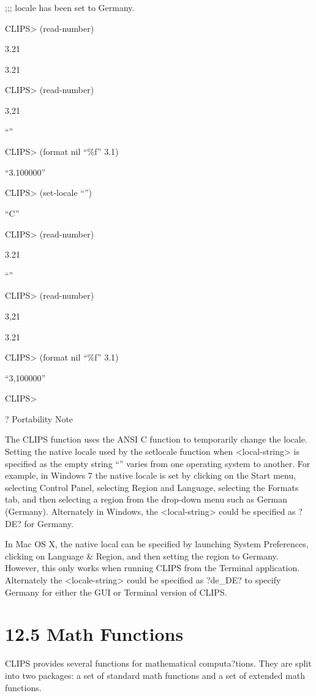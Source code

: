 \documentclass[letterpaper,10pt,english]{sphinxmanual}
\begin{document}
;;; locale has been set to Germany.

CLIPS\textgreater{} (read-number)

3.21

3.21

CLIPS\textgreater{} (read-number)

3,21

“”

CLIPS\textgreater{} (format nil “\%f” 3.1)

“3.100000”

CLIPS\textgreater{} (set-locale “”)

“C”

CLIPS\textgreater{} (read-number)

3.21

“”

CLIPS\textgreater{} (read-number)

3,21

3.21

CLIPS\textgreater{} (format nil “\%f” 3.1)

“3,100000”

CLIPS\textgreater{}

? Portability Note

The CLIPS  function uses the ANSI C function 
to temporarily change the locale. Setting the native locale used by the
setlocale function when \textless{}local-string\textgreater{} is specified as the empty string
“” varies from one operating system to another. For example, in Windows
7 the native locale is set by clicking on the Start menu, selecting
Control Panel, selecting Region and Language, selecting the Formats tab,
and then selecting a region from the drop-down menu such as German
(Germany). Alternately in Windows, the \textless{}local-string\textgreater{} could be specified
as ?DE? for Germany.

In Mac OS X, the native local can be specified by launching System
Preferences, clicking on Language \& Region, and then setting the region
to Germany. However, this only works when running CLIPS from the
Terminal application. Alternately the \textless{}locale-string\textgreater{} could be specified
as ?de\_DE? to specify Germany for either the GUI or Terminal version of
CLIPS.


\section{12.5 Math Functions}
\label{\detokenize{actions:math-functions}}
CLIPS provides several functions for mathematical computa?tions. They
are split into two packages: a set of standard math functions and a set
of extended math functions.
\end{document}
